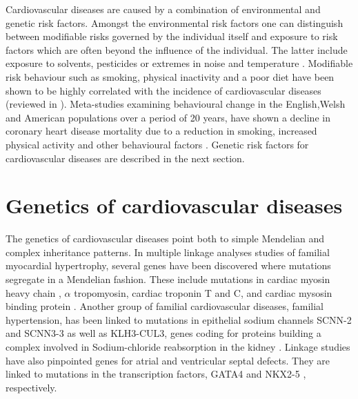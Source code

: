 Cardiovascular diseases are caused by a combination of environmental and genetic risk factors. Amongst the environmental risk factors one can distinguish between modifiable risks governed by the individual itself and exposure to risk factors which are often beyond the influence of the individual. The latter include exposure to solvents, pesticides or extremes in noise and temperature \citep{Bhatnagar2004,Brook2010,Babisch2014}. Modifiable risk behaviour such as smoking, physical inactivity and a poor diet have been shown to be highly correlated with the incidence of cardiovascular diseases (reviewed in \citep{OToole2008,Cosselman2015}). Meta-studies examining behavioural change in the English,Welsh and American populations over a period of 20 years, have shown a decline in coronary heart disease mortality due to a reduction in smoking, increased physical activity and other behavioural factors \citep{Unal2004,Ford2007}. Genetic risk factors for cardiovascular diseases are described in the next section. 

\section{Genetics of cardiovascular diseases}
The genetics of cardiovascular diseases point both to simple Mendelian and complex inheritance patterns. In multiple linkage analyses studies of familial myocardial hypertrophy, several genes have been discovered where mutations segregate in a Mendelian fashion. These include mutations in cardiac myosin heavy chain \citep{Geisterfer-Lowrance1990}, \(\alpha\) tropomyosin, cardiac troponin T and C, \citep{Thierfelder1994, Kimura1997} and cardiac mysosin binding protein \citep{Carrier1993,Bonne1995}. Another group of familial cardiovascular diseases, familial hypertension, has been linked to mutations in epithelial sodium channels  SCNN-2 and SCNN3-3 \citep{Boyden2012,Glover2014} as well as KLH3-CUL3, genes coding for proteins building a complex involved in Sodium-chloride reabsorption in the kidney  \citep{Hansson1995}. Linkage studies have also pinpointed genes for atrial and ventricular septal defects. They are linked to mutations in the transcription factors,  GATA4 \citep{Schott1998} and NKX2-5 \citep{Garg2003}, respectively. 

